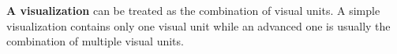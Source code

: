 \textbf{A visualization} can be treated as the combination of visual units. A simple visualization contains only one visual unit while an advanced one is usually the combination of multiple visual units. 




